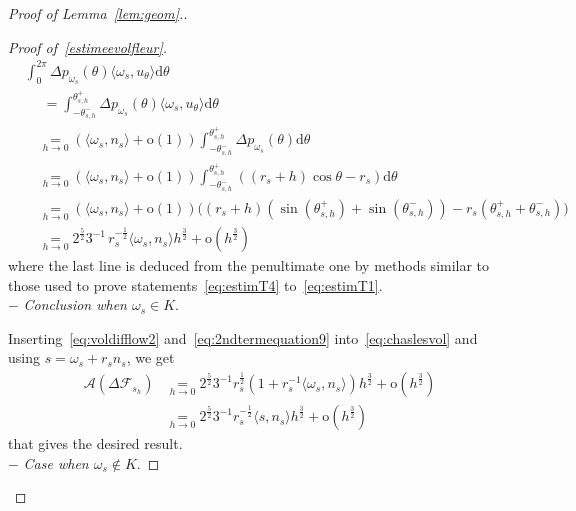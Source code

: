 \documentclass[AHL,Unicode,longabstracts,published]{cedram}
\newcommand{\cA}{\mathcal{A}}
\newcommand{\cF}{\mathcal{F}}
\newcommand{\dd}{\mathrm{d}}
\newcommand{\od}{\mathrm{o}}
\newcommand{\pass}{\vspace{0.3cm}\noindent}
\newcommand{\noi}{\noindent}
\newenvironment*{prooff}{\begin{proof}}{\let\qed\relax\end{proof}}
\begin{document}
\begin{proof}[{Proof of Lemma~\ref{lem:geom}.}]
\begin{prooff}[{Proof of~\eqref{estimeevolfleur}}]
\begin{align}
&\int_0^{2\pi} \Delta p_{\omega_s}(\theta)\langle \omega_s, u_{\theta}\rangle\dd\theta\nonumber\\
& \quad\; = \int_{-\theta_{s,h}^-}^{\theta_{s,h}^+} \Delta p_{\omega_s}(\theta)\langle \omega_s, u_{\theta}\rangle\dd\theta\nonumber\\
& \quad\underset{h\to 0}{=} (\langle \omega_s, n_s\rangle+\od(1))\int_{-\theta_{s,h}^-}^{\theta_{s,h}^+} \Delta p_{\omega_s}(\theta)\dd\theta\nonumber\\
&\quad \underset{h\to 0}{=} (\langle \omega_s, n_s\rangle+\od(1))\int_{-\theta_{s,h}^-}^{\theta_{s,h}^+} ((r_s+h)\cos\theta-r_s)\dd\theta\nonumber\\
&\quad \underset{h\to 0}{=} (\langle \omega_s, n_s\rangle +\od(1))\big((r_s+h)\left(\sin\left(\theta_{s,h}^+\right)+\sin\left(\theta_{s,h}^-\right)\right)-r_s\left(\theta_{s,h}^++\theta_{s,h}^-\right)\big)\nonumber\\
& \quad \underset{h\to 0}{=} 2^{\frac{5}{2}}3^{-1}\, r_s^{-\frac1{2}} \langle \omega_s, n_s\rangle h^{\frac{3}{2}}+ \od\left(h^{\frac32}\right)\label{eq:2ndtermequation9}
\end{align}
where the last line is deduced from the penultimate one by methods similar to those used to prove statements~\eqref{eq:estimT4} to~\eqref{eq:estimT1}.\\

 $-$ \emph{Conclusion when $\omega_s\in K$}.

Inserting~\eqref{eq:voldifflow2} and~\eqref{eq:2ndtermequation9} into~\eqref{eq:chaslesvol} and using $s=\omega_s+r_s n_s$, we get
\begin{align*}
\cA(\Delta\cF_{s_h}) & \underset{h\to 0}{=} 2^{\frac{5}{2}}3^{-1} r_s^{\frac1{2}}\left(1+r_s^{-1}\langle \omega_s, n_s\rangle\right)h^{\frac{3}{2}} + \od\left(h^{\frac32}\right)\\
& \underset{h\to 0}{=} 2^{\frac{5}{2}}3^{-1} r_s^{-\frac1{2}}\langle s,n_s\rangle h^{\frac{3}{2}} + \od\left(h^{\frac32}\right)
\end{align*}
that gives the desired result.\\

$-$ \emph{Case when $\omega_s\not\in K$}.


\end{prooff}
\end{proof}
\end{document}
